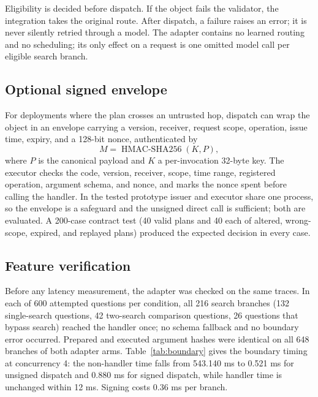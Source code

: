 \documentclass[paper]{ieice}
\begin{document}
Eligibility is decided before dispatch. If the object fails the validator, the integration takes the original route. After dispatch, a failure raises an error; it is never silently retried through a model. The adapter contains no learned routing and no scheduling; its only effect on a request is one omitted model call per eligible search branch.

\subsection{Optional signed envelope}
For deployments where the plan crosses an untrusted hop, dispatch can wrap the object in an envelope carrying a version, receiver, request scope, operation, issue time, expiry, and a 128-bit nonce, authenticated by
\begin{equation}
M=\operatorname{HMAC\mbox{-}SHA256}(K,P),
\end{equation}
where $P$ is the canonical payload and $K$ a per-invocation 32-byte key. The executor checks the code, version, receiver, scope, time range, registered operation, argument schema, and nonce, and marks the nonce spent before calling the handler. In the tested prototype issuer and executor share one process, so the envelope is a safeguard and the unsigned direct call is sufficient; both are evaluated. A 200-case contract test (40 valid plans and 40 each of altered, wrong-scope, expired, and replayed plans) produced the expected decision in every case.

\subsection{Feature verification}
Before any latency measurement, the adapter was checked on the same traces. In each of 600 attempted questions per condition, all 216 search branches (132 single-search questions, 42 two-search comparison questions, 26 questions that bypass search) reached the handler once; no schema fallback and no boundary error occurred. Prepared and executed argument hashes were identical on all 648 branches of both adapter arms. Table~\ref{tab:boundary} gives the boundary timing at concurrency 4: the non-handler time falls from 543.140 ms to 0.521 ms for unsigned dispatch and 0.880 ms for signed dispatch, while handler time is unchanged within 12 ms. Signing costs 0.36 ms per branch.
\end{document}
